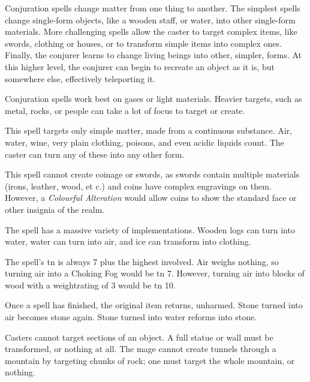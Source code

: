 
\begin{multicols}{2}

\noindent
Conjuration spells change matter from one thing to another.
The simplest spells change single-form objects, like a wooden staff, or water, into other single-form materials.
More challenging spells allow the caster to target complex items, like swords, clothing or houses, or to transform simple items into complex ones.
Finally, the conjurer learns to change living beings into other, simpler, forms.
At this higher level, the conjurer can begin to recreate an object as it is, but somewhere else, effectively teleporting it.

Conjuration spells work best on gases or light materials.
Heavier targets, such as metal, rocks, or people can take a lot of focus to target or create.

\spelllevel


This spell targets only simple matter, made from a continuous substance.
Air, water, wine, very plain clothing, poisons, and even acidic liquids count.
The caster can turn any of these into any other form.

This spell cannot create coinage or swords, as swords contain multiple materials (irons, leather, wood, et c.) and coins have complex engravings on them.
However, a \textit{Colourful Alteration} would allow coins to show the standard face or other insignia of the realm.

The spell has a massive variety of implementations.
Wooden logs can turn into water, water can turn into air, and ice can transform into clothing.

The spell's \gls{tn} is always 7 plus the highest  involved.
Air weighs nothing, so turning air into a Choking Fog would be \gls{tn} 7.
However, turning air into blocks of wood with a \gls{weightrating} of 3 would be \gls{tn} 10.

Once a spell has finished, the original item returns, unharmed.
Stone turned into air becomes stone again.
Stone turned into water reforms into stone.

Casters cannot target sections of an object.
A full statue or wall must be transformed, or nothing at all.
The mage cannot create tunnels through a mountain by targeting chunks of rock; one must target the whole mountain, or nothing.


\end{multicols}
